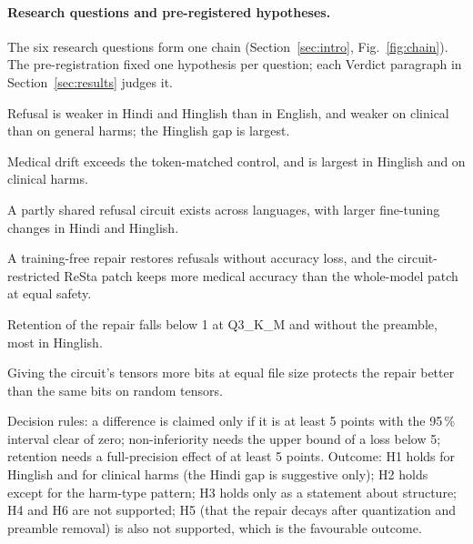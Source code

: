 \paragraph{Research questions and pre-registered hypotheses.} The six research questions form one chain (Section~\ref{sec:intro}, Fig.~\ref{fig:chain}). The pre-registration fixed one hypothesis per question; each Verdict paragraph in Section~\ref{sec:results} judges it.
\begin{description}\setlength{\itemsep}{0pt}
\item[H1] Refusal is weaker in Hindi and Hinglish than in English, and weaker on clinical than on general harms; the Hinglish gap is largest.
\item[H2] Medical drift exceeds the token-matched control, and is largest in Hinglish and on clinical harms.
\item[H3] A partly shared refusal circuit exists across languages, with larger fine-tuning changes in Hindi and Hinglish.
\item[H4] A training-free repair restores refusals without accuracy loss, and the circuit-restricted ReSta patch keeps more medical accuracy than the whole-model patch at equal safety.
\item[H5] Retention of the repair falls below 1 at Q3\_K\_M and without the preamble, most in Hinglish.
\item[H6] Giving the circuit's tensors more bits at equal file size protects the repair better than the same bits on random tensors.
\end{description}
Decision rules: a difference is claimed only if it is at least 5 points with the 95\,\% interval clear of zero; non-inferiority needs the upper bound of a loss below 5; retention needs a full-precision effect of at least 5 points. Outcome: H1 holds for Hinglish and for clinical harms (the Hindi gap is suggestive only); H2 holds except for the harm-type pattern; H3 holds only as a statement about structure; H4 and H6 are not supported; H5 (that the repair decays after quantization and preamble removal) is also not supported, which is the favourable outcome.

